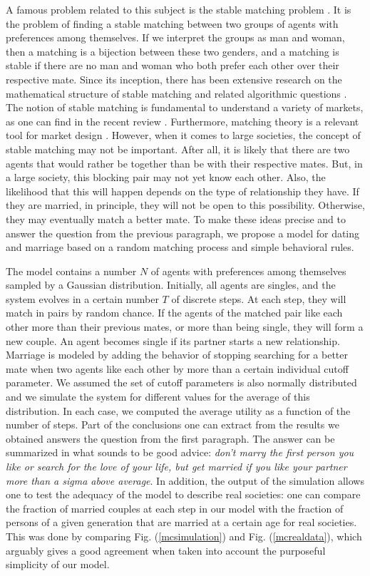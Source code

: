 \documentclass[12pt]{article}
\begin{document}
A famous problem related to this subject is the stable matching problem \cite{10.2307/2312726}. It is the problem of finding a stable matching between two groups of agents with preferences among themselves. If we interpret the groups as man and woman, then a matching is a bijection between these two genders, and a matching is stable if there are no man and woman who both prefer each other over their respective mate. Since its inception, there has been extensive research on the mathematical structure of stable matching and related algorithmic questions \cite{10.2307/2312726,knuthstable,gusfield1989stable,roth1992two}. The notion of stable matching is fundamental to understand a variety of markets, as one can find in the recent review \cite{ren2021matching}. Furthermore, matching theory is a relevant tool for market design \cite{article,NBERw29367}. However, when it comes to large societies, the concept of stable matching may not be important. After all, it is likely that there are two agents that would rather be together than be with their respective mates. But, in a large society, this blocking pair may not yet know each other. Also, the likelihood that this will happen depends on the type of relationship they have. If they are married, in principle, they will not be open to this possibility. Otherwise, they may eventually match a better mate. To make these ideas precise and to answer the question from the previous paragraph, we propose a model for dating and marriage based on a random matching process and simple behavioral rules.

The model contains a number $N$ of agents with preferences among themselves sampled by a Gaussian distribution. Initially, all agents are singles, and the system evolves in a certain number $T$ of discrete steps. At each step, they will match in pairs by random chance. If the agents of the matched pair like each other more than their previous mates, or more than being single, they will form a new couple. An agent becomes single if its partner starts a new relationship. Marriage is modeled by adding the behavior of stopping searching for a better mate when two agents like each other by more than a certain individual cutoff parameter. We assumed the set of cutoff parameters is also normally distributed and we simulate the system for different values for the average of this distribution. In each case, we computed the average utility as a function of the number of steps. Part of the conclusions one can extract from the results we obtained answers the question from the first paragraph. The answer can be summarized in what sounds to be good advice: \textit{don’t marry the first person you like or search for the love of your life, but get married if you like your partner more than a sigma above average}. In addition, the output of the simulation allows one to test the adequacy of the model to describe real societies: one can compare the fraction of married couples at each step in our model with the fraction of persons of a given generation that are married at a certain age for real societies. This was done by comparing Fig. (\ref{mcsimulation}) and Fig. (\ref{mcrealdata}), which arguably gives a good agreement when taken into account the purposeful simplicity of our model.
\end{document}
